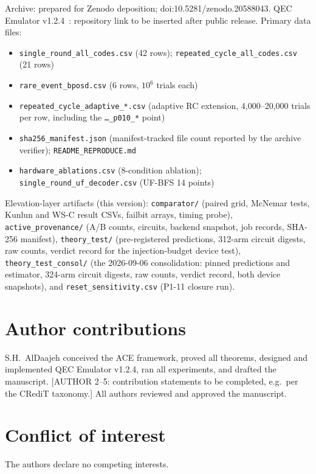 \documentclass[11pt,a4paper]{article}
\begin{document}
Archive: prepared for Zenodo deposition; doi:10.5281/zenodo.20588043.
QEC Emulator v1.2.4~\cite{AlDaajeh2026emulator}: repository link
to be inserted after public release.
Primary data files:
\begin{itemize}[leftmargin=1.4em,itemsep=0pt,topsep=2pt]
  \item \texttt{single\_round\_all\_codes.csv} (42 rows);
        \texttt{repeated\_cycle\_all\_codes.csv} (21 rows)
  \item \texttt{rare\_event\_bposd.csv} (6 rows, $10^{6}$ trials each)
  \item \texttt{repeated\_cycle\_adaptive\_*.csv} (adaptive RC extension,
        4{,}000--20{,}000 trials per row, including the
        \texttt{\dots\_p010\_*} point)
  \item \texttt{sha256\_manifest.json} (manifest-tracked file count
        reported by the archive verifier); \texttt{README\_REPRODUCE.md}
  \item \texttt{hardware\_ablations.csv} (8-condition ablation);
        \texttt{single\_round\_uf\_decoder.csv} (UF-BFS 14 points)
\end{itemize}
Elevation-layer artifacts (this version):
\texttt{comparator/} (paired grid, McNemar tests, Kunlun and WS-C
result CSVs, failbit arrays, timing probe),
\texttt{active\_provenance/} (A/B counts, circuits, backend snapshot,
job records, SHA-256 manifest),
\texttt{theory\_test/} (pre-registered predictions, 312-arm circuit
digests, raw counts, verdict record for the injection-budget device
test), \texttt{theory\_test\_consol/} (the 2026-09-06 consolidation:
pinned predictions and estimator, 324-arm circuit digests, raw counts,
verdict record, both device snapshots), and
\texttt{reset\_sensitivity.csv} (P1-11 closure run).

\section*{Author contributions}
S.H.\ AlDaajeh conceived the ACE framework, proved all theorems, designed
and implemented QEC Emulator v1.2.4, ran all experiments, and drafted the
manuscript. [AUTHOR 2--5: contribution statements to be completed, e.g.\
per the CRediT taxonomy.] All authors reviewed and approved the
manuscript.

\section*{Conflict of interest} The authors declare no competing interests.
\end{document}
